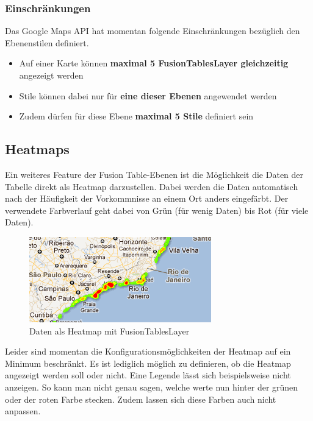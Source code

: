 \subsubsection{Einschränkungen}
\label{fusiontableslayer-styles-restrictions}
Das Google Maps API hat momentan folgende Einschränkungen bezüglich den Ebenenstilen definiert.

\begin{itemize}
\item Auf einer Karte können \textbf{maximal 5 FusionTablesLayer gleichzeitig} angezeigt werden
\item Stile können dabei nur für \textbf{eine dieser Ebenen} angewendet werden
\item Zudem dürfen für diese Ebene \textbf{maximal 5 Stile} definiert sein
\end{itemize}

\subsection{Heatmaps}
Ein weiteres Feature der Fusion Table-Ebenen ist die Möglichkeit die Daten der Tabelle direkt als Heatmap darzustellen. Dabei werden die Daten automatisch nach der Häufigkeit der Vorkommnisse an einem Ort anders eingefärbt. Der verwendete Farbverlauf geht dabei von Grün (für wenig Daten) bis Rot (für viele Daten).

\begin{figure}[!h]
	\centering
	\includegraphics{images/einfuehrung/gmap_fusiontableslayer_heatmap.png}
	\caption{Daten als Heatmap mit FusionTablesLayer}
	\label{fusiontableslayer-heatmap}
\end{figure}

Leider sind momentan die Konfigurationsmöglichkeiten der Heatmap auf ein Minimum beschränkt. Es ist lediglich möglich zu definieren, ob die Heatmap angezeigt werden soll oder nicht. Eine Legende lässt sich beispielsweise nicht anzeigen. So kann man nicht genau sagen, welche werte nun hinter der grünen oder der roten Farbe stecken. Zudem lassen sich diese Farben auch nicht anpassen.

